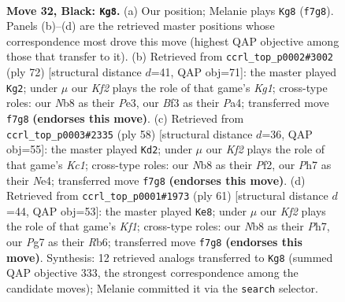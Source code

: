 \documentclass[11pt]{article}
\begin{document}
\clearpage

\begin{figure}[p]\centering
\begin{subfigure}{0.46\textwidth}\centering
\resizebox{\linewidth}{!}{%
\newchessgame
\chessboard[
  setfen={rn6/p1R2kpp/5p2/1P2p2P/P7/4Nb2/8/R1K5 b - - 3 32},
  showmover=false,
  pgfstyle=straightmove, color=movearrow, markmove={f7-g8}
]}
\caption{}
\end{subfigure}\hfill
\begin{subfigure}{0.46\textwidth}\centering
\resizebox{\linewidth}{!}{%
\newchessgame
\chessboard[
  setfen={1r3k2/6p1/p1B2p1p/8/PPR5/4P1P1/5P1P/3r2K1 w - - 3 37},
  showmover=false,
  pgfstyle=straightmove, color=movearrow, markmove={g1-g2}
]}
\caption{}
\end{subfigure}
\\[4pt]
\begin{subfigure}{0.46\textwidth}\centering
\resizebox{\linewidth}{!}{%
\newchessgame
\chessboard[
  setfen={3r3k/5p1n/4p2B/1p2P3/3pN3/P7/1PP2P1R/2K3r1 w - - 2 30},
  showmover=false,
  pgfstyle=straightmove, color=movearrow, markmove={c1-d2}
]}
\caption{}
\end{subfigure}\hfill
\begin{subfigure}{0.46\textwidth}\centering
\resizebox{\linewidth}{!}{%
\newchessgame
\chessboard[
  setfen={5k2/1p4pp/pr6/1b4P1/3P1R1P/2N5/1P3K2/8 b - - 1 31},
  showmover=false,
  pgfstyle=straightmove, color=movearrow, markmove={f8-e8}
]}
\caption{}
\end{subfigure}
\caption{\textbf{Move 32, Black: \texttt{Kg8}.} (a) Our position; Melanie plays \texttt{Kg8} (\texttt{f7g8}). Panels (b)--(d) are the retrieved master positions whose correspondence most drove this move (highest QAP objective among those that transfer to it). (b) Retrieved from \texttt{ccrl\_top\_p0002\#3002} (ply 72) [structural distance $d$=41, QAP obj=71]: the master played \texttt{Kg2}; under $\mu$ our \emph{Kf2} plays the role of that game's \emph{Kg1}; cross-type roles: our \emph{N}b8 as their \emph{P}e3, our \emph{B}f3 as their \emph{P}a4; transferred move \texttt{f7g8} \textbf{(endorses this move)}. (c) Retrieved from \texttt{ccrl\_top\_p0003\#2335} (ply 58) [structural distance $d$=36, QAP obj=55]: the master played \texttt{Kd2}; under $\mu$ our \emph{Kf2} plays the role of that game's \emph{Kc1}; cross-type roles: our \emph{N}b8 as their \emph{P}f2, our \emph{P}h7 as their \emph{N}e4; transferred move \texttt{f7g8} \textbf{(endorses this move)}. (d) Retrieved from \texttt{ccrl\_top\_p0001\#1973} (ply 61) [structural distance $d$=44, QAP obj=53]: the master played \texttt{Ke8}; under $\mu$ our \emph{Kf2} plays the role of that game's \emph{Kf1}; cross-type roles: our \emph{N}b8 as their \emph{P}h7, our \emph{P}g7 as their \emph{R}b6; transferred move \texttt{f7g8} \textbf{(endorses this move)}. Synthesis: 12 retrieved analogs transferred to \texttt{Kg8} (summed QAP objective 333, the strongest correspondence among the candidate moves); Melanie committed it via the \texttt{search} selector.}
\label{fig:thought-m63}
\end{figure}
\end{document}
